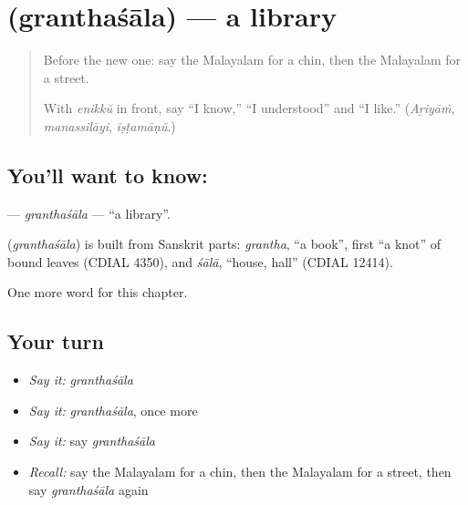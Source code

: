 \section[\texorpdfstring{\ml{ഗ്രന്ഥശാല} (granthaśāla)}{ഗ്രന്ഥശാല (granthaśāla)}]{ (granthaśāla) — a library}

\label{lesson:ML-C155-granthasala}



\begin{quote}
Before the new one: say the Malayalam for a chin, then the Malayalam for a street.

With \emph{enikkŭ} in front, say \textquotedblleft{}I know,\textquotedblright{} \textquotedblleft{}I understood\textquotedblright{} and \textquotedblleft{}I like.\textquotedblright{} (\emph{Aṟiyāṁ}, \emph{manassilāyi}, \emph{iṣṭamāṇŭ}.)
\end{quote}

\subsection*{You'll want to know: }
\textbf{} — \emph{granthaśāla} — \textquotedblleft{}a library\textquotedblright{}.

\begin{cousinweb}
\textbf{} (\emph{granthaśāla}) is built from Sanskrit parts: \emph{grantha}, \textquotedblleft{}a book\textquotedblright{}, first \textquotedblleft{}a knot\textquotedblright{} of bound leaves (CDIAL 4350), and \emph{śālā}, \textquotedblleft{}house, hall\textquotedblright{} (CDIAL 12414).
\end{cousinweb}

\begin{grammarlens}[title={What you've built}]
One more word for this chapter.
\end{grammarlens}

\subsection*{Your turn}
\begin{itemize}
\raggedright
  \item \emph{Say it:} \emph{granthaśāla}
  \item \emph{Say it:} \emph{granthaśāla}, once more
  \item \emph{Say it:} say \emph{granthaśāla}
  \item \emph{Recall:} say the Malayalam for a chin, then the Malayalam for a street, then say \emph{granthaśāla} again
\end{itemize}

